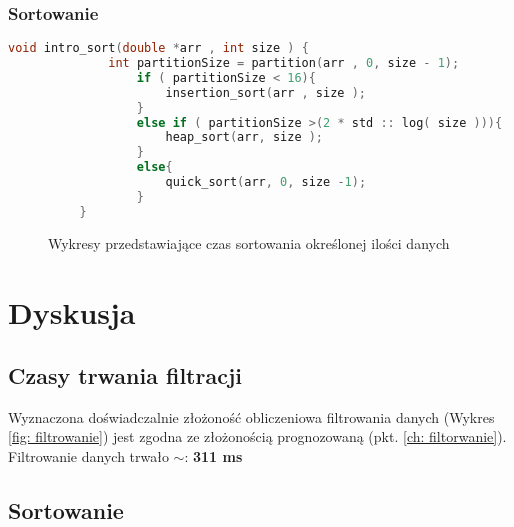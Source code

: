 \documentclass[12pt]{article}
\begin{document}
\subsubsection{Sortowanie}

{\small
\begin{lstlisting}[language=C++]
       void intro_sort(double *arr , int size ) {
              int partitionSize = partition(arr , 0, size - 1);
                  if ( partitionSize < 16){
                      insertion_sort(arr , size );
                  }
                  else if ( partitionSize >(2 * std :: log( size ))){
                      heap_sort(arr, size );
                  }
                  else{
                      quick_sort(arr, 0, size -1);
                  }
          }
       \end{lstlisting}

}




\begin{figure}[H]
       \centering
       \quad
\end{figure}
\begin{figure}[H]\ContinuedFloat
       
       \quad
       \renewcommand{\figurename}{Wykres.}
       \caption{Wykresy przedstawiające czas sortowania określonej ilości danych}
       \label{fig: introsort}
\end{figure}

\section{Dyskusja}

\subsection{Czasy trwania filtracji}

Wyznaczona doświadczalnie złożoność obliczeniowa filtrowania danych (Wykres \ref{fig: filtrowanie}) jest 
zgodna ze złożonością prognozowaną (pkt. \ref{ch: filtorwanie}).\\

Filtrowanie danych trwało $\sim $: \textbf{311 ms}
\subsection{Sortowanie}
\end{document}
